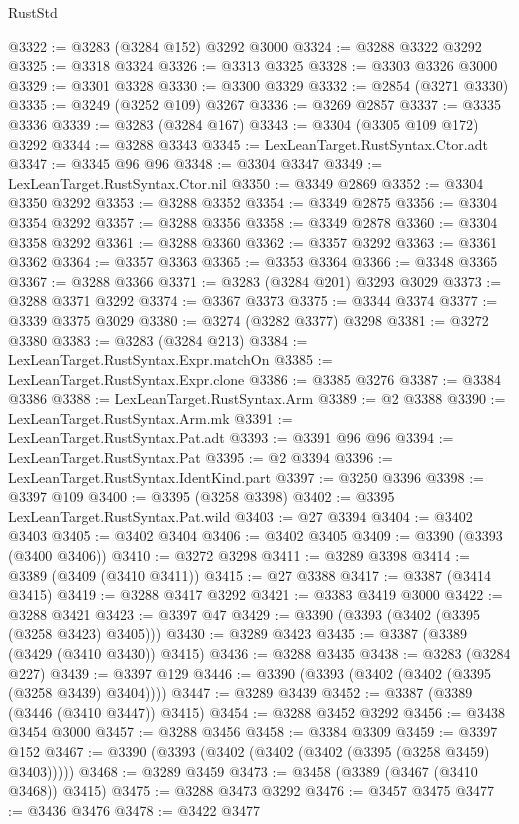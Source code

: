 \begin{lexlean}{RustStd}
\begin{coremodule}
@3322 := @3283 (@3284 @152) @3292 @3000
@3324 := @3288 @3322 @3292
@3325 := @3318 @3324
@3326 := @3313 @3325
@3328 := @3303 @3326 @3000
@3329 := @3301 @3328
@3330 := @3300 @3329
@3332 := @2854 (@3271 @3330)
@3335 := @3249 (@3252 @109) @3267
@3336 := @3269 @2857
@3337 := @3335 @3336
@3339 := @3283 (@3284 @167)
@3343 := @3304 (@3305 @109 @172) @3292
@3344 := @3288 @3343
@3345 := LexLeanTarget.RustSyntax.Ctor.adt
@3347 := @3345 @96 @96
@3348 := @3304 @3347
@3349 := LexLeanTarget.RustSyntax.Ctor.nil
@3350 := @3349 @2869
@3352 := @3304 @3350 @3292
@3353 := @3288 @3352
@3354 := @3349 @2875
@3356 := @3304 @3354 @3292
@3357 := @3288 @3356
@3358 := @3349 @2878
@3360 := @3304 @3358 @3292
@3361 := @3288 @3360
@3362 := @3357 @3292
@3363 := @3361 @3362
@3364 := @3357 @3363
@3365 := @3353 @3364
@3366 := @3348 @3365
@3367 := @3288 @3366
@3371 := @3283 (@3284 @201) @3293 @3029
@3373 := @3288 @3371 @3292
@3374 := @3367 @3373
@3375 := @3344 @3374
@3377 := @3339 @3375 @3029
@3380 := @3274 (@3282 @3377) @3298
@3381 := @3272 @3380
@3383 := @3283 (@3284 @213)
@3384 := LexLeanTarget.RustSyntax.Expr.matchOn
@3385 := LexLeanTarget.RustSyntax.Expr.clone
@3386 := @3385 @3276
@3387 := @3384 @3386
@3388 := LexLeanTarget.RustSyntax.Arm
@3389 := @2 @3388
@3390 := LexLeanTarget.RustSyntax.Arm.mk
@3391 := LexLeanTarget.RustSyntax.Pat.adt
@3393 := @3391 @96 @96
@3394 := LexLeanTarget.RustSyntax.Pat
@3395 := @2 @3394
@3396 := LexLeanTarget.RustSyntax.IdentKind.part
@3397 := @3250 @3396
@3398 := @3397 @109
@3400 := @3395 (@3258 @3398)
@3402 := @3395 LexLeanTarget.RustSyntax.Pat.wild
@3403 := @27 @3394
@3404 := @3402 @3403
@3405 := @3402 @3404
@3406 := @3402 @3405
@3409 := @3390 (@3393 (@3400 @3406))
@3410 := @3272 @3298
@3411 := @3289 @3398
@3414 := @3389 (@3409 (@3410 @3411))
@3415 := @27 @3388
@3417 := @3387 (@3414 @3415)
@3419 := @3288 @3417 @3292
@3421 := @3383 @3419 @3000
@3422 := @3288 @3421
@3423 := @3397 @47
@3429 := @3390 (@3393 (@3402 (@3395 (@3258 @3423) @3405)))
@3430 := @3289 @3423
@3435 := @3387 (@3389 (@3429 (@3410 @3430)) @3415)
@3436 := @3288 @3435
@3438 := @3283 (@3284 @227)
@3439 := @3397 @129
@3446 := @3390 (@3393 (@3402 (@3402 (@3395 (@3258 @3439) @3404))))
@3447 := @3289 @3439
@3452 := @3387 (@3389 (@3446 (@3410 @3447)) @3415)
@3454 := @3288 @3452 @3292
@3456 := @3438 @3454 @3000
@3457 := @3288 @3456
@3458 := @3384 @3309
@3459 := @3397 @152
@3467 := @3390 (@3393 (@3402 (@3402 (@3402 (@3395 (@3258 @3459) @3403)))))
@3468 := @3289 @3459
@3473 := @3458 (@3389 (@3467 (@3410 @3468)) @3415)
@3475 := @3288 @3473 @3292
@3476 := @3457 @3475
@3477 := @3436 @3476
@3478 := @3422 @3477

\end{coremodule}
\end{lexlean}
